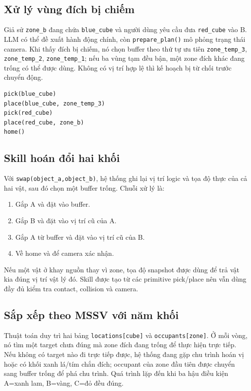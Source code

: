 \documentclass[a4paper,12pt]{article}
\newcommand{\code}[1]{\texttt{#1}}
\newcommand{\skill}[1]{\texttt{#1}}
\begin{document}
\subsection{Xử lý vùng đích bị chiếm}
Giả sử \code{zone\_b} đang chứa \code{blue\_cube} và người dùng yêu cầu đưa
\code{red\_cube} vào B. LLM có thể đề xuất hành động chính, còn
\code{prepare\_plan()} mô phỏng trạng thái camera. Khi thấy đích bị chiếm, nó
chọn buffer theo thứ tự ưu tiên \code{zone\_temp\_3}, \code{zone\_temp\_2},
\code{zone\_temp\_1}; nếu ba vùng tạm đều bận, một zone đích khác đang trống có
thể được dùng. Không có vị trí hợp lệ thì kế hoạch bị từ chối trước chuyển động.

\begin{lstlisting}[caption={Kế hoạch sau khi tự động giải quyết xung đột zone}]
pick(blue_cube)
place(blue_cube, zone_temp_3)
pick(red_cube)
place(red_cube, zone_b)
home()
\end{lstlisting}

\subsection{Skill hoán đổi hai khối}
Với \skill{swap(object\_a,object\_b)}, hệ thống ghi lại vị trí logic và tọa độ
thực của cả hai vật, sau đó chọn một buffer trống. Chuỗi xử lý là:
\begin{enumerate}
  \item Gắp A và đặt vào buffer.
  \item Gắp B và đặt vào vị trí cũ của A.
  \item Gắp A từ buffer và đặt vào vị trí cũ của B.
  \item Về home và để camera xác nhận.
\end{enumerate}
Nếu một vật ở khay nguồn thay vì zone, tọa độ snapshot được dùng để trả vật kia
đúng vị trí vật lý đó. Skill được tạo từ các primitive pick/place nên vẫn dùng
đầy đủ kiểm tra contact, collision và camera.

\subsection{Sắp xếp theo MSSV với năm khối}
Thuật toán duy trì hai bảng \code{locations[cube]} và
\code{occupants[zone]}. Ở mỗi vòng, nó tìm một target chưa đúng mà zone đích
đang trống để thực hiện trực tiếp. Nếu không có target nào đi trực tiếp được,
hệ thống đang gặp chu trình hoán vị hoặc có khối xanh lá/tím chắn đích; occupant
của zone đầu tiên được chuyển sang buffer trống để phá chu trình. Quá trình lặp
đến khi ba hậu điều kiện A=xanh lam, B=vàng, C=đỏ đều đúng.
\end{document}
